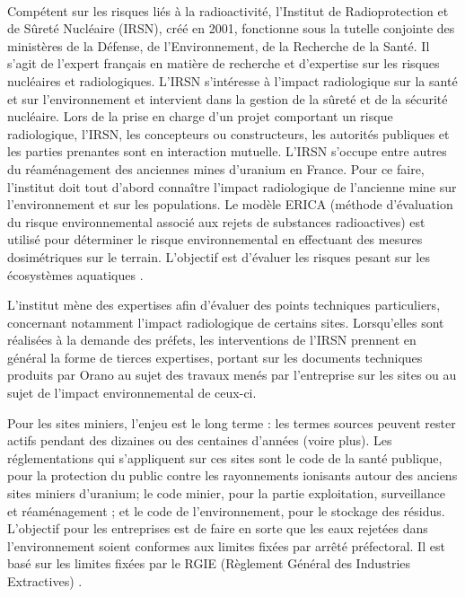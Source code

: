 \documentclass{article}
\begin{document}
\paragraph{} Compétent sur les risques liés à la radioactivité, l'Institut de Radioprotection et de Sûreté Nucléaire (IRSN), créé en 2001, fonctionne sous la tutelle conjointe des ministères de la Défense, de l’Environnement, de la Recherche de la Santé. Il s’agit de l’expert français en matière de recherche et d’expertise sur les risques nucléaires et radiologiques. L’IRSN s’intéresse à l’impact radiologique sur la santé et sur l'environnement et intervient dans la gestion de la sûreté et de la sécurité nucléaire. Lors de la prise en charge d’un projet comportant un risque radiologique, l’IRSN, les concepteurs ou constructeurs, les autorités publiques et les parties prenantes sont en interaction mutuelle. L’IRSN s’occupe entre autres du réaménagement des anciennes mines d’uranium en France. Pour ce faire, l’institut doit tout d’abord connaître l’impact radiologique de l’ancienne mine sur l’environnement et sur les populations. Le modèle ERICA (méthode d’évaluation du risque environnemental associé aux rejets de substances radioactives) est utilisé pour déterminer le risque environnemental en effectuant des mesures dosimétriques sur le terrain. L'objectif est d'évaluer les risques pesant sur les écosystèmes aquatiques \cite{dublineau_gestion_2020}.

L’institut mène des expertises afin d’évaluer des points techniques particuliers, concernant notamment l’impact radiologique de certains sites. Lorsqu’elles sont réalisées à la demande des préfets, les interventions de l’IRSN prennent en général la forme de tierces expertises, portant sur les documents techniques produits par Orano au sujet des travaux menés par l'entreprise sur les sites ou au sujet de l’impact environnemental de ceux-ci.

Pour les sites miniers, l’enjeu est le long terme : les termes sources peuvent rester actifs pendant des dizaines ou des centaines d'années (voire plus). Les réglementations qui s’appliquent sur ces sites sont le code de la santé publique, pour la protection du public contre les rayonnements ionisants autour des anciens sites miniers d’uranium; le code minier, pour la partie exploitation, surveillance et réaménagement ; et le code de l’environnement, pour le stockage des résidus. L’objectif pour les entreprises est de faire en sorte que les eaux rejetées dans l’environnement soient conformes aux limites fixées par arrêté préfectoral. Il est  basé sur les limites fixées par le RGIE (Règlement Général des Industries Extractives) \cite{dublineau_gestion_2020}.
\end{document}
